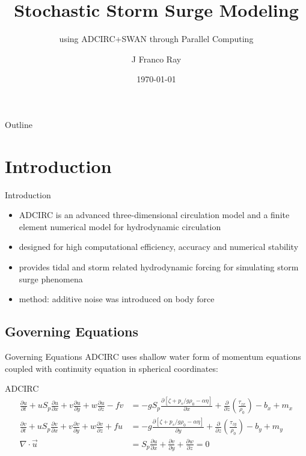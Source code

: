 \documentclass[10pt]{beamer}
\title[Stochastic Storm Surge Modeling \ldots]{Stochastic Storm Surge Modeling}
\subtitle{using ADCIRC+SWAN through Parallel Computing}
\author[JF Ray]{J Franco Ray}
\institute{
\sclaffiliation\\
\tref{jbrayo@up.edu.ph}
   }
\date{\today}
\begin{document}
{\SCLtitlepagebg
\begin{frame}
  \maketitle
  \insertSCLDCSUPlogos
\end{frame}}

\begin{frame}[noframenumbering]{Outline}
\tableofcontents
\end{frame}


\section{Introduction}
\begin{frame}{Introduction}{}
  \begin{itemize}
    \item<1-> ADCIRC is an advanced three-dimensional circulation model and a finite element numerical model for hydrodynamic circulation
    \item<1-> designed for high computational efficiency, accuracy and numerical stability
    \item<1-> provides tidal and storm related hydrodynamic forcing for simulating storm surge phenomena
    \item<2-> method: additive noise was introduced on body force
  \end{itemize}
\end{frame}

\subsection{Governing Equations}
\begin{frame}{Governing Equations}{}
  ADCIRC uses shallow water form of momentum equations coupled with continuity equation in spherical coordinates:
  \begin{block}{ADCIRC}
  	\footnotesize
  	\begin{align*}
  	\frac{\partial u}{\partial t} + u S_p \frac{\partial u}{\partial x} + v \frac{\partial u}{\partial y} + w \frac{\partial u}{\partial z} - fv &= -g S_p \frac{\partial \left[\zeta + p_s/g \rho_0 - \alpha \eta\right]}{\partial x} + \frac{\partial}{\partial z} \left(\frac{\tau_{zx}}{\rho_0}\right) - b_x + m_x \\
  	\frac{\partial v}{\partial t} + u S_p \frac{\partial v}{\partial x} + v \frac{\partial v}{\partial y} + w \frac{\partial v}{\partial z} + fu &= -g \frac{\partial \left[\zeta + p_s/g \rho_0 - \alpha \eta\right]}{\partial y} + \frac{\partial}{\partial z} \left(\frac{\tau_{zy}}{\rho_0}\right) - b_y + m_y \\
  	\nabla \cdot \vec{u} &= S_p \frac{\partial u}{\partial x} + \frac{\partial v}{\partial y} + \frac{\partial w}{\partial z} = 0
  	\end{align*}
  	\normalsize
  \end{block}
\end{frame}
\end{document}
